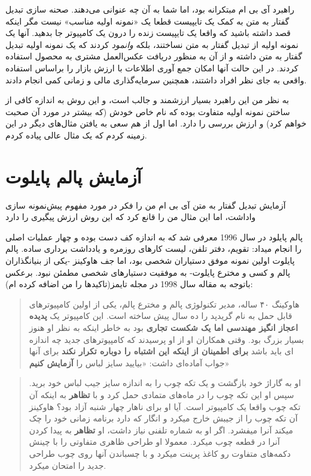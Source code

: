 راهبرد آی بی ام مبتکرانه بود، اما شما به آن چه عنوانی می‌دهند. صحنه سازی
تبدیل گفتار به متن به کمک یک تایپیست قطعا یک «نمونه اولیه مناسب» نیست
مگر اینکه قصد داشته باشید که واقعا یک تایپیست زنده را درون یک کامپیوتر
جا بدهید. آنها یک نمونه اولیه از تبدیل گفتار به متن نساختند، بلکه
\emph{وانمود} کردند که یک نمونه اولیه تبدیل گفتار به متن داشته و از آن
به منظور دریافت عکس‌العمل مشتری به محصول استفاده کردند. در این حالت آنها
امکان جمع آوری اطلاعات با ارزش بازار را براساس استفاده واقعی به جای نظر
افراد داشتند، همچنین سرمایه‌گذاری مالی و زمانی کمی انجام دادند.

به نظر من این راهبرد بسیار ارزشمند و جالب است، و این روش به اندازه کافی
از ساختن نمونه اولیه متفاوت بوده که نام خاص خودش (که بیشتر در مورد آن
صحبت خواهم کرد) و ارزش بررسی را دارد. اما اول از هم سعی به یافتن
مثال‌های دیگر در این زمینه کردم که یک مثال عالی پیاده کردم.

\section{آزمایش پالم
پایلوت}\label{ux622ux632ux645ux627ux6ccux634-ux67eux627ux644ux645-ux67eux627ux6ccux644ux648ux62a}

آزمایش تبدیل گفتار به متن آی بی ام من را فکر در مورد مفهوم پیش‌نمونه
سازی واداشت، اما این مثال من را قانع کرد که این روش ارزش پیگیری را دارد

پالم پایلود در سال 1996 معرفی شد که به اندازه کف دست بوده و چهار عملیات
اصلی را انجام میداد: تقویم، دفتر تلفن، لیست کارهای روزمره و یادداشت
برداری ساده. پالم پایلوت اولین نمونه موفق دستیاران شخصی بود، اما جف
هاوکینز -یکی از بنیانگذاران پالم و کسی و مخترع پایلوت- به موفقیت
دستیارهای شخصی مطمئن نبود. برعکس باتوجه به مقاله سال 1998 در مجله
تایمز(تاکیدها را من اضافه کرده ام):

\begin{quote}
هاوکینگ ۴۰ ساله، مدیر تکنولوژی پالم و مخترع پالم، یکی از اولین
کامپیوترهای قابل حمل به نام گریدپد را ده سال پیش ساخته است. این کامپیوتر
یک \textbf{پدیده اعجاز انگیز مهندسی اما یک شکست تجاری} بود به خاطر اینکه
به نظر او هنوز بسیار بزرگ بود. وقتی همکاران او از او پرسیدند که
کامپیوترهای جدید چه اندازه ای باید باشد \textbf{برای اطمینان از اینکه
این اشتباه را دوباره تکرار نکند} برای آنها جواب آماده‌ای داشت: «بیایید
سایز لباس را \textbf{آزمایش کنیم}»
\end{quote}

\begin{quote}
او به گاراژ خود بازگشت و یک تکه چوب را به اندازه سایز جیب لباس خود برید.
سپس او این تکه چوب را در ماه‌های متمادی حمل کرد و با \textbf{تظاهر} به
اینکه آن تکه چوب واقعا یک کامپیوتر است. آیا او برای ناهار چهار شنبه آزاد
بود؟ هاوکینز آن تکه چوب را از جیبش خارج میکرد و انگار که دارد برنامه
زمانی خود را چک میکند آنرا میفشرد. اگر او به شماره تلفنی نیاز داشت، او
\textbf{تظاهر} به پیدا کردن آنرا در قطعه چوب میکرد. معمولا او طراحی
ظاهری متفاوتی را با چینش دکمه‌های متفاوت رو کاغذ پرینت میکرد و با
چسباندن آنها روی چوب طراحی جدید را امتحان میکرد.
\end{quote}

